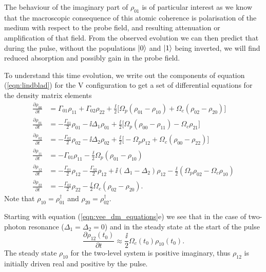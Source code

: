     The behaviour of the imaginary part of $\rho_{01}$ is of particular interest
    as we know that the macroscopic consequence of this atomic coherence is
    polarisation of the medium with respect to the probe field, and resulting
    attenuation or amplification of that field. From the observed evolution we
    can then predict that during the pulse, without the populations $\Ket{0}$
    and $\Ket{1}$ being inverted, we will find reduced absorption and possibly
    gain in the probe field.

    To understand this time evolution, we write out the components of equation
    (\ref{eqn:lindblad}) for the V configuration to get a set of differential
    equations for the density matrix elements
    \begin{subequations}
    \begin{align}
    \frac{\partial \rho_{00}}{\partial t} &= \Gamma_{01} \rho_{11} + \Gamma_{02} 
    \rho_{22} + \frac{\ii}{2} \bigg[ \Omega_p 
    ( \rho_{01} - \rho_{10}) + \Omega_c ( \rho_{02} - \rho_{20}) \bigg] \\
    \frac{\partial \rho_{01}}{\partial t} &= -\frac{\Gamma_{01}}{2} \rho_{01} - 
    \ii \Delta_1 \rho_{01} + \frac{\ii}{2} \bigg[ \Omega_p 
    (\rho_{00} - \rho_{11}) - \Omega_c \rho_{21} \bigg] \\
    \frac{\partial \rho_{02}}{\partial t} &= -\frac{\Gamma_{02}}{2} \rho_{02} - 
    \ii \Delta_2 \rho_{02} + \frac{\ii}{2} \bigg[ -\Omega_p \rho_{12} + \Omega_c 
    ( \rho_{00} - \rho_{22} ) \bigg] \\
    \frac{\partial \rho_{11}}{\partial t} &= -\Gamma_{01} \rho_{11} - 
    \frac{\ii}{2} \Omega_p (\rho_{01} - \rho_{10}) \\
    \frac{\partial \rho_{12}}{\partial t} &= -\frac{\Gamma_{01}}{2} \rho_{12} - 
    \frac{\Gamma_{02}}{2} \rho_{12} + \ii (\Delta_1 - \Delta_2) \rho_{12} - 
    \frac{\ii}{2} (\Omega_p \rho_{02} - \Omega_c{\rho_{10}})\\
    \frac{\partial \rho_{22}}{\partial t} &= -\frac{\Gamma_{02}}{2} \rho_{22} - 
    \frac{\ii}{2} \Omega_c ( \rho_{02} - \rho_{20} ).
    \end{align}
    \label{eqn:vee_dm_equations}
    \end{subequations}
    Note that $\rho_{10} = \rho_{01}^\dagger$ and $\rho_{20} =
    \rho_{02}^\dagger$.

    Starting with equation (\ref{eqn:vee_dm_equations}e) we see that in the case
    of two-photon resonance ($\Delta_1 = \Delta_2 = 0$) and in the steady state
    at the start of the pulse
    \begin{equation}
       \frac{\partial \rho_{12}(t_{0})}{\partial t} \approx \frac{\ii}{2} 
        \Omega_c(t_{0}) \rho_{10}(t_{0}).
      \label{eqn:rho12}
    \end{equation}
    The steady state $\rho_{10}$ for the two-level system is
    positive imaginary, thus $\rho_{12}$ is initially driven real and positive
    by the pulse.

